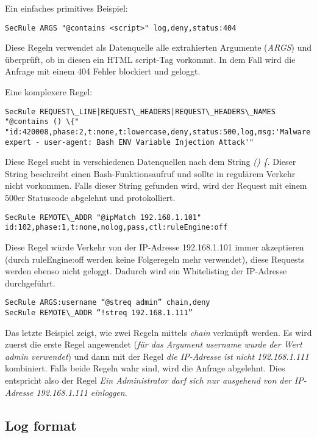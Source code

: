 Ein einfaches primitives Beispiel:

\begin{verbatim}
SecRule ARGS "@contains <script>" log,deny,status:404
\end{verbatim}

Diese Regeln verwendet als Datenquelle alle extrahierten Argumente (\textit{ARGS}) und überprüft, ob in diesen ein HTML script-Tag vorkommt. In dem Fall wird die Anfrage mit einem 404 Fehler blockiert und geloggt.

Eine komplexere Regel:

\begin{verbatim}
SecRule REQUEST\_LINE|REQUEST\_HEADERS|REQUEST\_HEADERS\_NAMES "@contains () \{" "id:420008,phase:2,t:none,t:lowercase,deny,status:500,log,msg:'Malware expert - user-agent: Bash ENV Variable Injection Attack'"
\end{verbatim}

Diese Regel sucht in verschiedenen Datenquellen nach dem String \textit{() \{}. Dieser String beschreibt einen Bash-Funktionsaufruf und sollte in regulärem Verkehr nicht vorkommen. Falls dieser String gefunden wird, wird der Request mit einem 500er Statuscode abgelehnt und protokolliert.

\begin{verbatim}
SecRule REMOTE\_ADDR "@ipMatch 192.168.1.101" id:102,phase:1,t:none,nolog,pass,ctl:ruleEngine:off
\end{verbatim}

Diese Regel würde Verkehr von der IP-Adresse 192.168.1.101 immer akzeptieren (durch ruleEngine:off werden keine Folgeregeln mehr verwendet), diese Requests werden ebenso nicht geloggt. Dadurch wird ein Whitelisting der IP-Adresse durchgeführt.

\begin{verbatim}
SecRule ARGS:username “@streq admin” chain,deny
SecRule REMOTE\_ADDR “!streq 192.168.1.111”
\end{verbatim}

Das letzte Beispiel zeigt, wie zwei Regeln mittels \textit{chain} verknüpft werden. Es wird zuerst die erste Regel angewendet (\textit{für das Argument username wurde der Wert admin verwendet}) und dann mit der Regel \textit{die IP-Adresse ist nicht 192.168.1.111} kombiniert. Falls beide Regeln wahr sind, wird die Anfrage abgelehnt. Dies entspricht also der Regel \textit{Ein Administrator darf sich nur ausgehend von der IP-Adresse 192.168.1.111 einloggen}.

\subsection{Log format}


